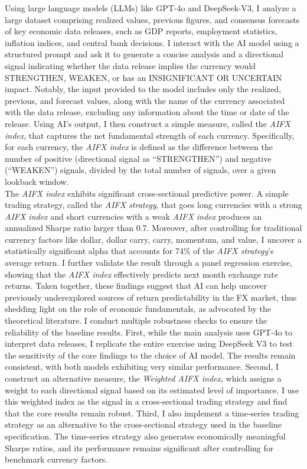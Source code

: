 \documentclass[12pt,oneside,letter]{article}
\begin{document}
	Using large language models (LLMs) like GPT-4o and DeepSeek-V3, I analyze a large dataset comprising realized values, previous figures, and consensus forecasts of key economic data releases, such as GDP reports, employment statistics, inflation indices, and central bank decisions. I interact with the AI model using a structured prompt and ask it to generate a concise analysis and a directional signal indicating whether the data release implies the currency would STRENGTHEN, WEAKEN, or has an INSIGNIFICANT OR UNCERTAIN impact. Notably, the input provided to the model includes only the realized, previous, and forecast values, along with the name of the currency associated with the data release, excluding any information about the time or date of the release. Using AI's output, I then construct a simple measure, called the \textit{AIFX index}, that captures the net fundamental strength of each currency. Specifically, for each currency, the \textit{AIFX index} is defined as the difference between the number of positive (directional signal as “STRENGTHEN”) and negative (“WEAKEN”) signals, divided by the total number of signals, over a given lookback window.\\
	The \textit{AIFX index} exhibits significant cross-sectional predictive power. A simple trading strategy, called the \textit{AIFX strategy}, that goes long currencies with a strong \textit{AIFX index} and short currencies with a weak \textit{AIFX index} produces an annualized Sharpe ratio larger than 0.7. Moreover, after controlling for traditional currency factors like dollar, dollar carry, carry, momentum, and value, I uncover a statistically significant alpha that accounts for 74\% of the \textit{AIFX strategy}’s average return. I further validate the result through a panel regression exercise, showing that the \textit{AIFX index} effectively predicts next month exchange rate returns. Taken together, these findings suggest that AI can help uncover previously underexplored sources of return predictability in the FX market, thus shedding light on the role of economic fundamentals, as advocated by the theoretical literature. \newline
	I conduct multiple robustness checks to ensure the reliability of the baseline results. First, while the main analysis uses GPT-4o to interpret data releases, I replicate the entire exercise using DeepSeek V3 to test the sensitivity of the core findings to the choice of AI model. The results remain consistent, with both models exhibiting very similar performance. Second, I construct an alternative measure, the \textit{Weighted AIFX index}, which assigns a weight to each directional signal based on its estimated level of importance. I use this weighted index as the signal in a cross-sectional trading strategy and find that the core results remain robust. Third, I also implement a time-series trading strategy as an alternative to the cross-sectional strategy used in the baseline specification. The time-series strategy also generates economically meaningful Sharpe ratios, and its performance remains significant after controlling for benchmark currency factors. \newline
\end{document}
